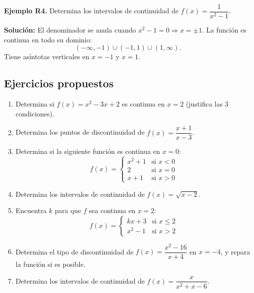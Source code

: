 \documentclass[12pt, a4paper]{article}
\begin{document}
\textbf{Ejemplo R4.} Determina los intervalos de continuidad de $f(x) = \dfrac{1}{x^2 - 1}$.

\begin{cuadrosolucion}
  \textbf{Solución:} El denominador se anula cuando $x^2 - 1 = 0 \Rightarrow x = \pm 1$. La función es continua en todo su dominio:
  $$(-\infty, -1) \cup (-1, 1) \cup (1, \infty).$$
  Tiene asíntotas verticales en $x = -1$ y $x = 1$.
\end{cuadrosolucion}

\newpage

\subsection{Ejercicios propuestos}

\begin{enumerate}[leftmargin=*, resume]
  \item \facil{} Determina si $f(x) = x^2 - 3x + 2$ es continua en $x = 2$ (justifica las 3 condiciones).

  \item \facil{} Determina los puntos de discontinuidad de $f(x) = \dfrac{x + 1}{x - 3}$.

  \item \facil{} Determina si la siguiente función es continua en $x = 0$:
        $$f(x) = \begin{cases} x^2 + 1 & \text{si } x < 0 \\ 2 & \text{si } x = 0 \\ x + 1 & \text{si } x > 0 \end{cases}$$

  \item \facil{} Determina los intervalos de continuidad de $f(x) = \sqrt{x - 2}$.

  \item \medio{} Encuentra $k$ para que $f$ sea continua en $x = 2$:
        $$f(x) = \begin{cases} kx + 3 & \text{si } x \le 2 \\ x^2 - 1 & \text{si } x > 2 \end{cases}$$

  \item \medio{} Determina el tipo de discontinuidad de $f(x) = \dfrac{x^2 - 16}{x + 4}$ en $x = -4$, y repara la función si es posible.

  \item \medio{} Determina los intervalos de continuidad de $f(x) = \dfrac{x}{x^2 + x - 6}$.


\end{enumerate}
\end{document}
